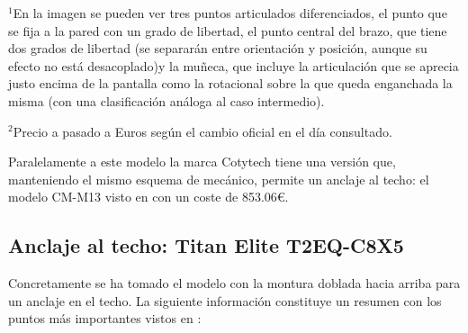 \begin{minipage}{1\textwidth}
	\footnotesize{$^1$En la imagen se pueden ver tres puntos articulados diferenciados, el punto que se fija a la pared con un grado de libertad, el punto central del brazo, que tiene dos grados de libertad (se separarán entre orientación y posición, aunque su efecto no está desacoplado)y la muñeca, que incluye la articulación que se aprecia justo encima de la pantalla como la rotacional sobre la que queda enganchada la misma (con una clasificación análoga al caso intermedio).}
	
    \footnotesize{$^2$Precio a pasado a Euros según el cambio oficial en el día consultado.}
\end{minipage}

 Paralelamente a este modelo la marca Cotytech tiene una versión que, manteniendo el mismo esquema de mecánico, permite un anclaje al techo: el modelo CM-M13 visto en \cite{CotytechCMM13:2018} con un coste de 853.06\euro.

\subsection{Anclaje al techo: Titan Elite T2EQ-C8X5}

 Concretamente se ha tomado el modelo con la montura doblada hacia arriba para un anclaje en el techo. La siguiente información constituye un resumen con los puntos más importantes vistos en \cite{TitanElite:2018}:

